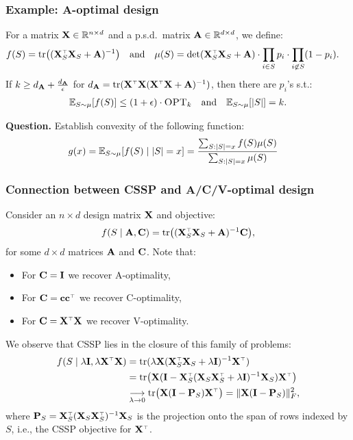 \documentclass[10pt]{beamer}
\begin{document}
\begin{frame}
  \frametitle{Example: A-optimal design}
  For a matrix $\mathbf X\in\mathbb R^{n\times d}$ and a p.s.d.~matrix
  $\mathbf A\in\mathbb R^{d\times d}$, we define:
  \begin{align*}
   \hspace{-4mm} f(S) = \tr\big((\X_S^\top\X_S+\A)^{-1}\big)\quad\text{and}\quad
    \mu(S)=\det(\X_S^\top\X_S+\A)\cdot\prod_{i\in S}p_i\cdot\prod_{i\not\in S}(1-p_i).
  \end{align*}
  If $k\geq d_{\mathbf A}+\frac{d_{\mathbf A}}\epsilon$ for
  $d_{\A}=\tr(\X^\top\X(\X^\top\X+\A)^{-1})$, then there are $p_i$'s s.t.:
  \begin{align*}
    \mathbb E_{S\sim\mu}[f(S)]\leq(1+\epsilon)\cdot{\textsc{OPT}_k}\quad\text{and}\quad\mathbb E_{S\sim\mu}[|S|]=k.
  \end{align*}
  \vspace{5mm}
  
  \textbf{Question.} Establish convexity of the following function:
  \begin{align*}
    g(x) &=\mathbb E_{S\sim\mu}[f(S)\mid |S|=x] =
           \frac{\sum_{S:|S|=x}f(S)\mu(S)}{\sum_{S:|S|=x}\mu(S)}
  \end{align*}
\end{frame}


\begin{frame}
  \frametitle{Connection between CSSP and A/C/V-optimal design}
  Consider an $n\times d$ design matrix $\mathbf X$ and objective:
  \begin{align*}
    f(S\mid \A,\C) = \tr\big((\X_S^\top\X_S+\A)^{-1}\C\big),
  \end{align*}
  for some $d\times d$ matrices $\mathbf A$ and $\mathbf C$. Note that:
  \begin{itemize}
  \item For $\mathbf C=\mathbf I$ we recover A-optimality,
  \item For $\C=\cb\cb^\top$ we recover C-optimality,
  \item For $\C=\X^\top\X$ we recover V-optimality.
  \end{itemize}
We observe that CSSP lies in the closure of this family of
  problems:
  \begin{align*}
    f(S\mid \lambda\I,\lambda\X^\top\X)
    &= \tr(\lambda\X(\X_S^\top\X_S+\lambda\I)^{-1}\X^\top)
    \\
    &=\tr\big(\X(\I-\X_S^\top(\X_S\X_S^\top+\lambda\I)^{-1}\X_S)\X^\top\big)
    \\
    &\underset{\lambda\rightarrow 0}{\longrightarrow}
     \tr\big(\X(\I-\P_S)\X^\top\big) = \|\X(\I-\P_S)\|_F^2,
  \end{align*}
  where $\P_S=\X_S^\top(\X_S\X_S^\top)^{-1}\X_S$ is the projection onto
  the span of rows indexed by $S$, i.e., the CSSP objective for $\X^\top$.
\end{frame}
\end{document}

